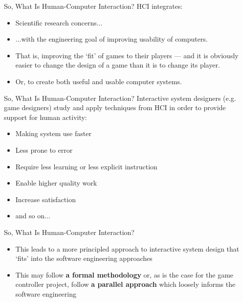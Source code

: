 \begin{frame}{So, What Is Human-Computer Interaction?}
	HCI integrates:
	
	\begin{itemize}
		\item Scientific research concerns... \pause
		\item ...with the engineering goal of improving usability of computers. \pause
		\item That is, improving the `fit' of games to their players --- and it is obviously easier to change the design of a game than it is to change its player.
		\item Or, to create both useful and usable computer systems.
	\end{itemize}
\end{frame}

\begin{frame}{So, What Is Human-Computer Interaction?}
	Interactive system designers (e.g. game designers) study and apply techniques from HCI in order to provide support for human activity:
	
	\begin{itemize}
		\item Making system use faster
		\item Less prone to error
		\item Require less learning or less explicit instruction
		\item Enable higher quality work
		\item Increase satisfaction
		\item and so on...
	\end{itemize}
\end{frame}

\begin{frame}{So, What Is Human-Computer Interaction?}
	\begin{itemize}
		\item This leads to a more principled approach to interactive system design that `fits' into the software engineering approaches
		\item This may follow \textbf{a formal methodology} or, as is the case for the game controller project, follow \textbf{a parallel approach}
		which loosely informs the software engineering
	\end{itemize}
\end{frame}

